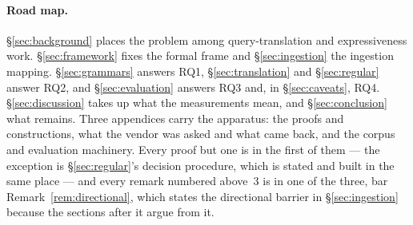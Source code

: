 \paragraph{Road map.}
\S\ref{sec:background} places the problem among query-translation and expressiveness
work. \S\ref{sec:framework} fixes the formal frame and \S\ref{sec:ingestion} the
ingestion mapping. \S\ref{sec:grammars} answers RQ1, \S\ref{sec:translation} and
\S\ref{sec:regular} answer RQ2, and \S\ref{sec:evaluation} answers RQ3 and, in
\S\ref{sec:caveats}, RQ4. \S\ref{sec:discussion} takes up what the measurements mean,
and \S\ref{sec:conclusion} what remains. Three appendices carry the apparatus: the
proofs and constructions, what the vendor was asked and what came back, and the corpus
and evaluation machinery. Every proof but one is in the first of them --- the
exception is \S\ref{sec:regular}'s decision procedure, which is stated and built in
the same place --- and every remark numbered above~3 is in one of the three, bar
Remark~\ref{rem:directional}, which states the directional barrier in \S\ref{sec:ingestion}
because the sections after it argue from it.
